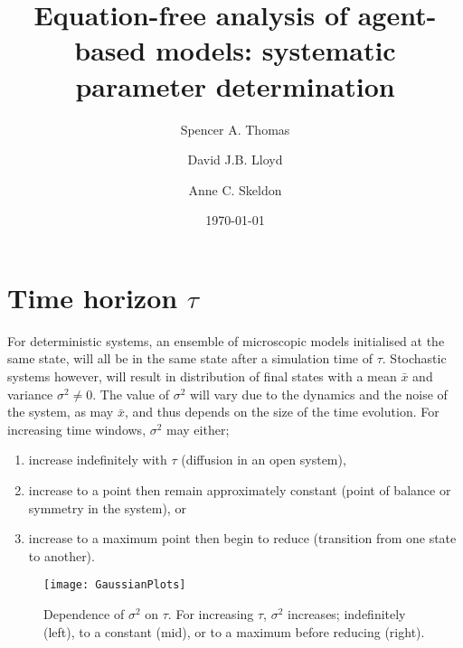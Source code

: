 \documentclass[11pt]{article}
\begin{document}
\title{Equation-free analysis of agent-based models: systematic parameter determination}

\author[1]{Spencer A. Thomas}
\author[1]{David J.B. Lloyd}
\author[1]{Anne C. Skeldon}
\date{\today}
\maketitle

\renewcommand{\vec}[1]{\mathbf{#1}}



\section{Time horizon $\tau$}
\label{sec:parametersTau}

For deterministic systems, an ensemble of microscopic models initialised at the same state, will  
all be in the same state after a simulation time of $\tau$. Stochastic systems however, will 
result in distribution of final states with a mean $\bar{x}$ and variance $\sigma^2\neq0$. 
The value of $\sigma^2$ will vary due to the dynamics and the noise of the system, as may $\bar{x}$, and thus depends on the size of the time evolution. For increasing time windows, $\sigma^2$ may either;
\begin{enumerate}
\label{list:tauType}
\item increase indefinitely with $\tau$ (diffusion in an open system), 
\item increase to a point then remain approximately constant (point of balance or symmetry in the system), or
\item increase to a maximum point then begin to reduce (transition from one state to another). 
\end{enumerate}

\begin{figure}[h]
	\centering
	\texttt{[image: GaussianPlots]}
	\caption{Dependence of $\sigma^2$ on $\tau$. For increasing $\tau$, $\sigma^2$ increases; indefinitely (left), to a constant (mid), or to a maximum before reducing (right). \label{fig:tauPredictor}}
\end{figure}
\end{document}
